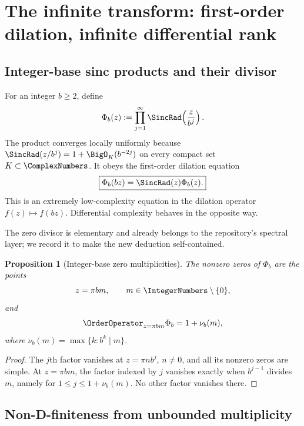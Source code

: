\documentclass[11pt]{article}
\numberwithin{equation}{section}
\newtheorem{proposition}[theorem]{Proposition}
\theoremstyle{definition}
\theoremstyle{remark}
\begin{document}
\section{The infinite transform: first-order dilation, infinite differential rank}
\label{sec:infinite-nonholonomic}

\subsection{Integer-base sinc products and their divisor}

For an integer $b\ge2$, define
\begin{equation}
 \Phi_b(z):=\prod_{j=1}^{\infty}\SincRad\!\left(\frac{z}{b^j}\right).
 \label{eq:base-b-product}
\end{equation}
The product converges locally uniformly because
$\SincRad(z/b^j)=1+\BigO_K(b^{-2j})$ on every compact set $K\subset\ComplexNumbers$.  It obeys
the first-order dilation equation
\begin{equation}
 \boxed{\Phi_b(bz)=\SincRad(z)\Phi_b(z).}
 \label{eq:first-order-dilation}
\end{equation}
This is an extremely low-complexity equation in the dilation operator
$f(z)\mapsto f(bz)$.  Differential complexity behaves in the opposite way.

The zero divisor is elementary and already belongs to the repository's
spectral layer; we record it to make the new deduction self-contained.

\begin{proposition}[Integer-base zero multiplicities]
\label{prop:base-b-zeros}
The nonzero zeros of $\Phi_b$ are the points
\begin{equation}
 z=\pi bm,
 \qquad m\in\IntegerNumbers\setminus\{0\},
 \label{eq:base-b-zero-lattice}
\end{equation}
and
\begin{equation}
 \OrderOperator_{z=\pi bm}\Phi_b=1+\nu_b(m),
 \label{eq:base-b-zero-order}
\end{equation}
where $\nu_b(m)=\max\{k:b^k\mid m\}$.
\end{proposition}
\begin{proof}
The $j$th factor vanishes at $z=\pi nb^j$, $n\ne0$, and all its nonzero zeros
are simple.  At $z=\pi bm$, the factor indexed by $j$ vanishes exactly when
$b^{j-1}$ divides $m$, namely for
$1\le j\le1+\nu_b(m)$.  No other factor vanishes there.
\end{proof}

\subsection{Non-D-finiteness from unbounded multiplicity}
\end{document}
